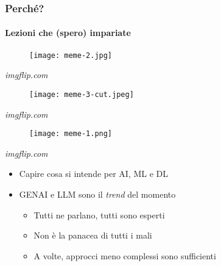 %
\begin{frame}[t,fragile] \frametitle{Perché?}
\framesubtitle{Lezioni che (spero) impariate}
{\scriptsize
    \begin{minipage}[b]{\textwidth}
        \begin{minipage}[b]{0.33\textwidth}
            \centering
            \begin{figure}[ht]
                \texttt{[image: meme-2.jpg]}
            \end{figure}
            \begin{flushright}
                \vspace*{-7pt}
                {\tiny\textit{\textcopyright imgflip.com}}
            \end{flushright}
        \end{minipage}
        \begin{minipage}[b]{0.33\textwidth}
            \centering
            \begin{figure}[ht]
                \texttt{[image: meme-3-cut.jpeg]}
            \end{figure}
            \begin{flushright}
                \vspace*{-7pt}
                {\tiny\textit{\textcopyright imgflip.com}}
            \end{flushright}
        \end{minipage}
        \begin{minipage}[b]{0.33\textwidth}
            \centering
            \begin{figure}[ht]
                \texttt{[image: meme-1.png]}
            \end{figure}
            \begin{flushright}
                \vspace*{-7pt}
                {\tiny\textit{\textcopyright imgflip.com}}
            \end{flushright}
        \end{minipage}
    \end{minipage}
    \begin{itemize}[leftmargin=10pt,align=right]
        \item[\alert{\faArrowCircleRight}] Capire cosa si intende per AI, ML e DL
        \item[\alert{\faArrowCircleRight}] GENAI e LLM sono il \textit{trend} del momento
        \begin{itemize}[leftmargin=10pt,align=right]
            \item[\alert{\faArrowCircleRight}] Tutti ne parlano, tutti sono esperti
            \item[\alert{\faArrowCircleRight}] \alert{Non} è la panacea di tutti i mali
            \item[\alert{\faArrowCircleRight}] A volte, approcci meno complessi sono sufficienti
        \end{itemize}
    \end{itemize}
}
\end{frame}
